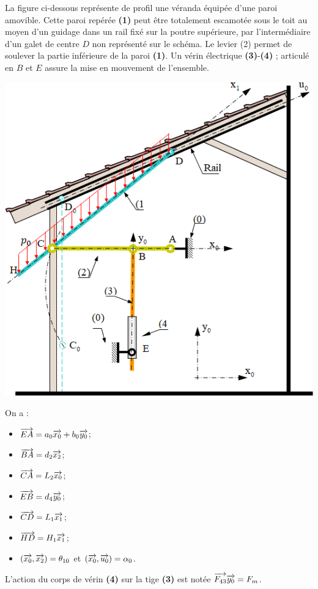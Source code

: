 \documentclass[10pt,fleqn]{article} %
\begin{document}
\begin{multicols}{2}
La figure ci-dessous représente de profil une véranda équipée d'une paroi amovible. Cette paroi repérée \textbf{(1)} peut être totalement escamotée sous le toit au moyen d'un guidage dans un rail fixé sur la poutre supérieure, par l'intermédiaire d'un galet de centre $D$ non représenté sur le schéma. Le levier (2) permet de soulever la partie inférieure de la paroi \textbf{(1)}. Un vérin électrique \textbf{(3)}-\textbf{(4)} ; articulé en $B$ et $E$ assure la mise en mouvement de l'ensemble.

\begin{center}
\includegraphics[width=.9\linewidth]{images/fig_04}
\end{center}

On a : 
\begin{itemize}
\item $\overrightarrow{EA}=a_0\overrightarrow{x_0} + b_0\overrightarrow{y_0}$;
\item $\overrightarrow{BA}=d_2\overrightarrow{x_2}$;
\item $\overrightarrow{CA}=L_2\overrightarrow{x_0}$;
\item $\overrightarrow{EB}=d_4\overrightarrow{y_0}$;
\item $\overrightarrow{CD}=L_1\overrightarrow{x_1}$;
\item $\overrightarrow{HD}=H_1\overrightarrow{x_1}$;
\item $\left(\overrightarrow{x_0},\overrightarrow{x_2}\right)=\theta_{10}$ et $\left(\overrightarrow{x_0},\overrightarrow{u_0}\right)=\alpha_{0}$.
\end{itemize}
L'action du corps de vérin \textbf{(4)} sur la tige \textbf{(3)} est notée $\overrightarrow{F_{43}}\overrightarrow{y_0}=F_m$.


\end{multicols}
\end{document}
